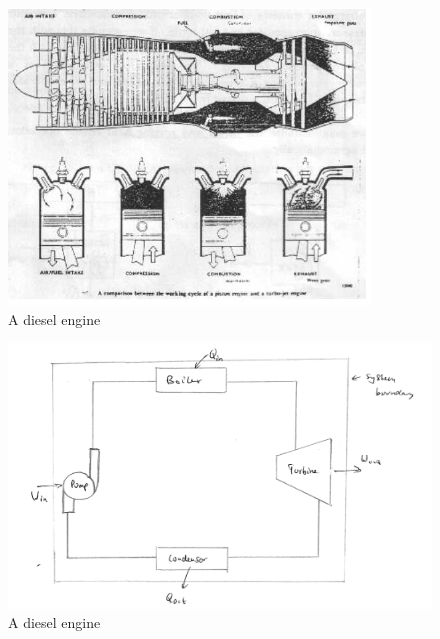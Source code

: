 \documentclass[class=report, crop=false, 12pt,a4paper]{standalone}
\begin{document}
\begin{figure}[H]
  \begin{center}
    \includegraphics[width = \textwidth]{../img/DieselEngine}
    \caption{A diesel engine}
  \end{center}
\end{figure}
\begin{figure}[H]
  \begin{center}
    \includegraphics[width = \textwidth]{../img/SteamPowerPlantDiagram}
    \caption{A diesel engine}
  \end{center}
\end{figure}
\end{document}
